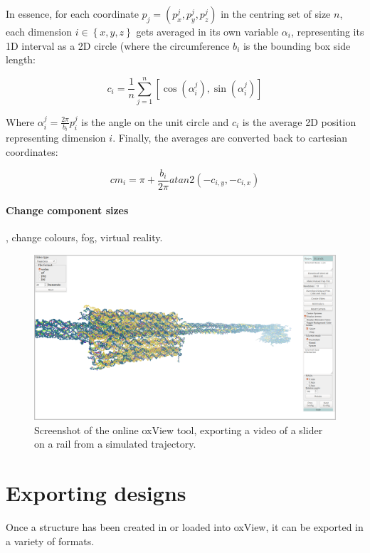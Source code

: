 In essence, for each coordinate \(p_j = \left(p_x^j, p_y^j, p_z^j\right) \) in the centring set of size \(n\), each dimension \(i \in \left\{x,y,z\right\}\) gets averaged in its own variable \(\alpha_i\), representing its 1D interval as a 2D circle (where the circumference \(b_i\) is the bounding box side length:

\[
  c_i = \frac{1}{n} \sum_{j = 1}^{n} \left[ \cos \left( \alpha_i^j \right), \sin \left( \alpha_i^j \right) \right]  
\]

Where \(\alpha_i^j = \frac{2 \pi}{b_i} p_i^j\) is the angle on the unit circle and \(c_i\) is the average 2D position representing dimension \(i\). Finally, the averages are converted back to cartesian coordinates:

\[
  cm_i = \pi + \frac{b_i}{2\pi} atan2(-c_{i,y}, -c_{i, x})
\]

\paragraph{Change component sizes}


, change colours, fog, virtual reality.

\begin{figure}
\centering\includegraphics[width=\textwidth]{figures/oxview.png} 
\caption{Screenshot of the online oxView tool, exporting a video of a slider on a rail from a simulated trajectory.}
\label{fig:oxview}\end{figure}

\section{Exporting designs}
\label{sec:oxdna_export}
Once a structure has been created in or loaded into oxView, it can be exported in a variety of formats.

